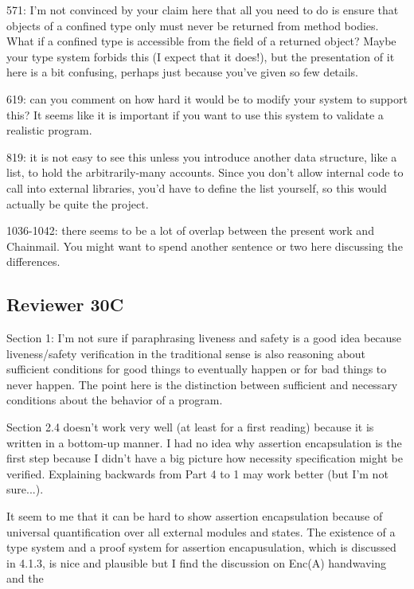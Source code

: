 \documentclass[11pt]{amsart}
\begin{document}
571: I’m not convinced by your claim here that all you need to do is ensure that objects of a confined type only must never be returned from method bodies. What if a confined type is accessible from the field of a returned object? Maybe your type system forbids this (I expect that it does!), but the presentation of it here is a bit confusing, perhaps just because you’ve given so few details.

619: can you comment on how hard it would be to modify your system to support this? It seems like it is important if you want to use this system to validate a realistic program.

819: it is not easy to see this unless you introduce another data structure, like a list, to hold the arbitrarily-many accounts. Since you don’t allow internal code to call into external libraries, you’d have to define the list yourself, so this would actually be quite the project.

1036-1042: there seems to be a lot of overlap between the present work and Chainmail. You might want to spend another sentence or two here discussing the differences.
  
 
  \subsection*{Reviewer 30C}
  

Section 1: I'm not sure if paraphrasing liveness and safety is a good
idea because liveness/safety verification in the traditional sense is
also reasoning about sufficient conditions for good things to
eventually happen or for bad things to never happen.  The point
here is the distinction between sufficient and necessary conditions
about the behavior of a program.

Section 2.4 doesn't work very well (at least for a first reading)
because it is written in a bottom-up manner.  I had no idea why
assertion encapsulation is the first step because I didn't have a big
picture how necessity specification might be verified.  Explaining backwards from Part 4 to 1
may work better (but I'm not sure...).

It seem to me that it can be hard to show assertion encapsulation
because of universal quantification over all external modules and
states.  The existence of a type system and a proof system for
assertion encapusulation, which is discussed in 4.1.3, is nice and
plausible but I find the discussion on Enc(A) handwaving and the
  
\end{document}
